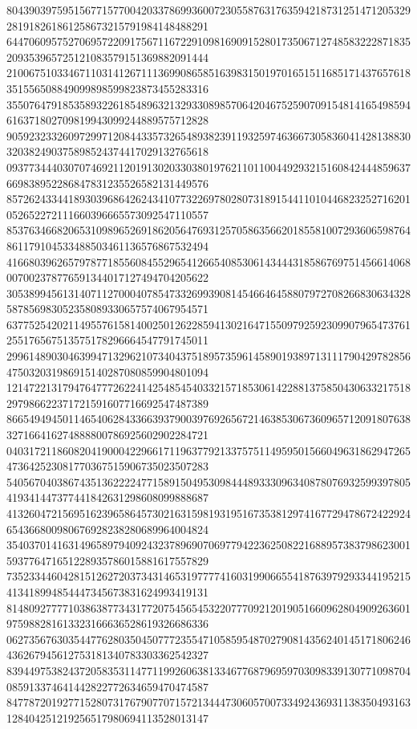 \begin{DoxyCode}
      804390397595156771577004203378699360072305587631763594218731251471205329281918261861258673215791984148488291
      644706095752706957220917567116722910981690915280173506712748583222871835209353965725121083579151369882091444
      210067510334671103141267111369908658516398315019701651511685171437657618351556508849099898599823873455283316
      355076479185358932261854896321329330898570642046752590709154814165498594616371802709819943099244889575712828
      905923233260972997120844335732654893823911932597463667305836041428138830320382490375898524374417029132765618
      093773444030707469211201913020330380197621101100449293215160842444859637669838952286847831235526582131449576
      857262433441893039686426243410773226978028073189154411010446823252716201052652272111660396665573092547110557
      853763466820653109896526918620564769312570586356620185581007293606598764861179104533488503461136576867532494
      416680396265797877185560845529654126654085306143444318586769751456614068007002378776591344017127494704205622
      305389945613140711270004078547332699390814546646458807972708266830634328587856983052358089330657574067954571
      637752542021149557615814002501262285941302164715509792592309907965473761255176567513575178296664547791745011
      299614890304639947132962107340437518957359614589019389713111790429782856475032031986915140287080859904801094
      121472213179476477726224142548545403321571853061422881375850430633217518297986622371721591607716692547487389
      866549494501146540628433663937900397692656721463853067360965712091807638327166416274888800786925602902284721
      040317211860820419000422966171196377921337575114959501566049631862947265473642523081770367515906735023507283
      540567040386743513622224771589150495309844489333096340878076932599397805419341447377441842631298608099888687
      413260472156951623965864573021631598193195167353812974167729478672422924654366800980676928238280689964004824
      354037014163149658979409243237896907069779422362508221688957383798623001593776471651228935786015881617557829
      735233446042815126272037343146531977774160319906655418763979293344195215413418994854447345673831624993419131
      814809277771038638773431772075456545322077709212019051660962804909263601975988281613323166636528619326686336
      062735676303544776280350450777235547105859548702790814356240145171806246436267945612753181340783303362542327
      839449753824372058353114771199260638133467768796959703098339130771098704085913374641442822772634659470474587
      847787201927715280731767907707157213444730605700733492436931138350493163128404251219256517980694113528013147

\end{DoxyCode}
